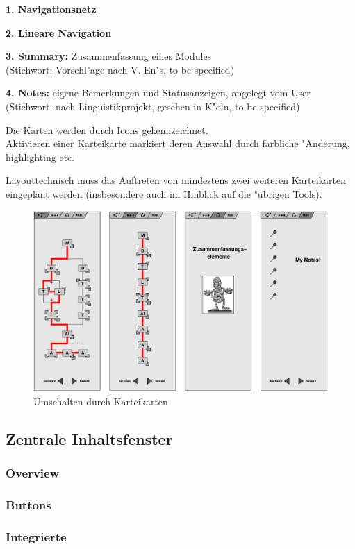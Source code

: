 \begin{list_sabina}
        \item \textbf{1. Navigationsnetz}
        \item \textbf{2. Lineare Navigation}
        \item \textbf{3. Summary:}
        Zusammenfassung eines Modules \\
        (Stichwort: Vorschl"age nach V. En"s, to be specified)
        \item \textbf{4. Notes:}
        eigene Bemerkungen und Statusanzeigen, angelegt vom User \\
        (Stichwort: nach Linguistikprojekt, gesehen in K"oln, to be specified)
\end{list_sabina}

Die Karten werden durch Icons gekennzeichnet.\\
Aktivieren einer Karteikarte markiert deren Auswahl durch farbliche
"Anderung, highlighting etc.

Layouttechnisch muss das Auftreten von mindestens zwei weiteren
Karteikarten eingeplant werden (insbesondere auch im Hinblick auf die
"ubrigen Tools).

\begin{figure}[h]
\begin{center}
\ifx\pdfoutput\undefined
\else
  \includegraphics{Skizzen/all_cards.pdf}
\fi
\caption{Umschalten durch Karteikarten}
\end{center}
\end{figure}



\clearpage


\subsection{Zentrale Inhaltsfenster}


\subsubsection{Overview}


\subsubsection{Buttons}


\subsubsection{Integrierte}

